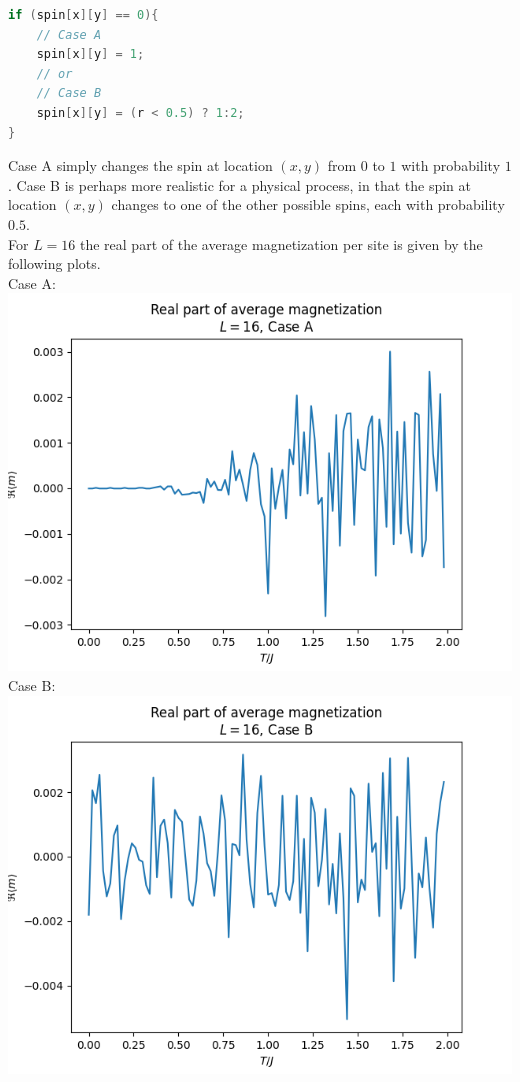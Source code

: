 \documentclass[12pt]{article}
\begin{document}
\begin{lstlisting}[language=C++]
if (spin[x][y] == 0){
    // Case A
    spin[x][y] = 1;
    // or
    // Case B
    spin[x][y] = (r < 0.5) ? 1:2;
}
\end{lstlisting}

Case A simply changes the spin at location $(x, y)$ from $0$ to $1$ with
probability $1$. Case B is perhaps more realistic for a physical process, in
that the spin at location $(x, y)$ changes to one of the other possible spins, each with probability
$0.5$. \\
For $L=16$ the real part of the average magnetization per site is given by the following
plots. \\
Case A:\\
\includegraphics[width = \textwidth]{ram.png}\\
Case B: \\
\includegraphics[width = \textwidth]{r_ram.png}\\
\end{document}
